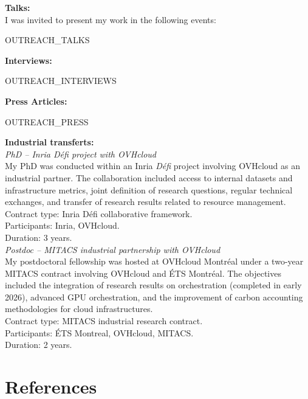\documentclass[10pt,a4paper,roman]{moderncv}
\begin{document}
\textbf{Talks:}\\ %

I was invited to present my work in the following events:\\

\begin{itemize}
\setlength{\itemsep}{0.35em}
{{OUTREACH_TALKS}}
\end{itemize}

\hfill \break
\textbf{Interviews:}\newline

{{OUTREACH_INTERVIEWS}}

\hfill \break
\textbf{Press Articles:}\newline

{{OUTREACH_PRESS}}

\hfill \break
\textbf{Industrial transferts:}\\

\textit{PhD -- Inria Défi project with OVHcloud}\\

My PhD was conducted within an Inria \textit{Défi} project involving OVHcloud as an industrial partner. The collaboration included access to internal datasets and infrastructure metrics, joint definition of research questions, regular technical exchanges, and transfer of research results related to resource management.\\
Contract type: Inria Défi collaborative framework. \\
Participants: Inria, OVHcloud.\\
Duration: 3 years.\\

\textit{Postdoc -- MITACS industrial partnership with OVHcloud}\\

My postdoctoral fellowship was hosted at OVHcloud Montréal under a two-year MITACS contract involving OVHcloud and ÉTS Montréal. The objectives included the integration of research results on orchestration (completed in early 2026), advanced GPU orchestration, and the improvement of carbon accounting methodologies for cloud infrastructures.\\  
Contract type: MITACS industrial research contract.\\ 
Participants: ÉTS Montreal, OVHcloud, MITACS.\\ 
Duration: 2 years.

\section{References}
\end{document}

